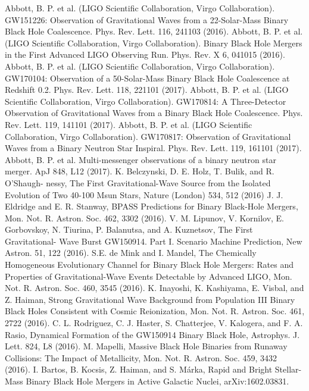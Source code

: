 \documentclass[binding=0.6cm, LaM]{sapthesis}
\begin{document}
\begin{thebibliography}{500}
	 Abbott, B. P. et al. (LIGO Scientific Collaboration, Virgo Collaboration). GW151226: Observation of Gravitational Waves from a 22-Solar-Mass Binary Black Hole Coalescence. Phys. Rev. Lett. 116, 241103 (2016). 
	 Abbott, B. P. et al. (LIGO Scientific Collaboration, Virgo Collaboration). Binary Black Hole Mergers in the First Advanced LIGO Observing Run. Phys. Rev. X 6, 041015 (2016).
	 Abbott, B. P. et al. (LIGO Scientific Collaboration, Virgo Collaboration). GW170104: Observation of a 50-Solar-Mass Binary Black Hole Coalescence at Redshift 0.2. Phys. Rev. Lett. 118, 221101 (2017).
	 Abbott, B. P. et al. (LIGO Scientific Collaboration, Virgo Collaboration). GW170814: A Three-Detector Observation of Gravitational Waves from a Binary Black Hole Coalescence. Phys. Rev. Lett. 119, 141101 (2017).
	 Abbott, B. P. et al. (LIGO Scientific Collaboration, Virgo Collaboration). GW170817: Observation of Gravitational Waves from a Binary Neutron Star Inspiral. Phys. Rev. Lett. 119, 161101 (2017).         
	 Abbott, B. P. et al. Multi-messenger observations of a binary neutron star merger. ApJ 848, L12 (2017).
	 K. Belczynski, D. E. Holz, T. Bulik, and R. O’Shaugh- nessy, The First Gravitational-Wave Source from the Isolated Evolution of Two 40-100 Msun Stars, Nature (London) 534, 512 (2016)
	 J. J. Eldridge and E. R. Stanway, BPASS Predictions for Binary Black-Hole Mergers, Mon. Not. R. Astron. Soc. 462, 3302 (2016).
	 V. M. Lipunov, V. Kornilov, E. Gorbovskoy, N. Tiurina, P. Balanutsa, and A. Kuznetsov, The First Gravitational- Wave Burst GW150914. Part I. Scenario Machine Prediction, New Astron. 51, 122 (2016).
	 S.E. de Mink and I. Mandel, The Chemically Homogeneous Evolutionary Channel for Binary Black Hole Mergers: Rates and Properties of Gravitational-Wave Events Detectable by Advanced LIGO, Mon. Not. R. Astron. Soc. 460, 3545 (2016).
 	 K. Inayoshi, K. Kashiyama, E. Visbal, and Z. Haiman, Strong Gravitational Wave Background from Population III Binary Black Holes Consistent with Cosmic Reionization, Mon. Not. R. Astron. Soc. 461, 2722 (2016).
 	 C. L. Rodriguez, C. J. Haster, S. Chatterjee, V. Kalogera, and F. A. Rasio, Dynamical Formation of the GW150914 Binary Black Hole, Astrophys. J. Lett. 824, L8 (2016). M. Mapelli, Massive Black Hole Binaries from Runaway Collisions: The Impact of Metallicity, Mon. Not. R. Astron. Soc. 459, 3432 (2016).
         I. Bartos, B. Kocsis, Z. Haiman, and S. Márka, Rapid and Bright Stellar-Mass Binary Black Hole Mergers in Active Galactic Nuclei, arXiv:1602.03831.

\end{thebibliography}
\end{document}
